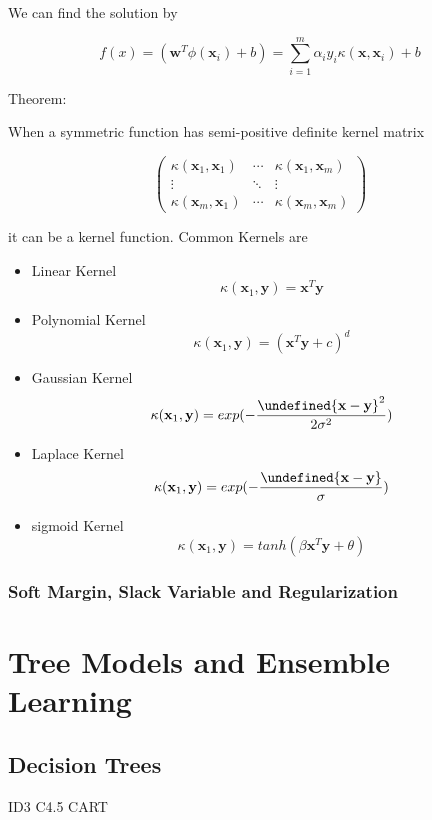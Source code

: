 \documentclass[11pt, openany]{book}              %
\let\norm\undefined %
\DeclarePairedDelimiter\norm{\lVert}{\rVert}
\begin{document}
We can find the solution by

$$f(x) = (\mathbf{w}^T\phi(\mathbf{x}_i)+ b) =\sum_{i=1}^m \alpha_i y_i 
\kappa(\mathbf{x}, \mathbf{x}_i ) + b$$

Theorem:

When a symmetric function has semi-positive definite kernel matrix

$$\begin{pmatrix} 
  				\kappa(\mathbf{x}_1, \mathbf{x}_1 )& \cdots & \kappa(\mathbf{x}_1, \mathbf{x}_m )\\ 
  				\vdots & \ddots & \vdots \\
  				\kappa(\mathbf{x}_m, \mathbf{x}_1 )& \cdots & \kappa(\mathbf{x}_m, \mathbf{x}_m )  
\end{pmatrix} $$

 it can be a kernel function. Common Kernels are
 
 \begin{itemize}
	\item Linear Kernel $$\kappa(\mathbf{x}_1, \mathbf{y} ) = \mathbf{x}^T\mathbf{y}$$
	\item Polynomial Kernel $$\kappa(\mathbf{x}_1, \mathbf{y} ) = (\mathbf{x}^T\mathbf{y} + c)^d$$
	\item Gaussian Kernel $$\kappa(\mathbf{x}_1, \mathbf{y} ) = exp(-\frac{\norm{\mathbf{x}-\mathbf{y}}^2}{2\sigma^2})$$
	\item Laplace Kernel $$\kappa(\mathbf{x}_1, \mathbf{y} ) = exp(-\frac{\norm{\mathbf{x}-\mathbf{y}}}{\sigma})$$
	\item sigmoid Kernel $$\kappa(\mathbf{x}_1, \mathbf{y} ) = tanh(\beta \mathbf{x}^T\mathbf{y} + \theta)$$
\end{itemize}
 

\subsection{Soft Margin, Slack Variable and Regularization}



\chapter{Tree Models and Ensemble Learning}


\section{Decision Trees}

ID3 
C4.5
CART
\end{document}
